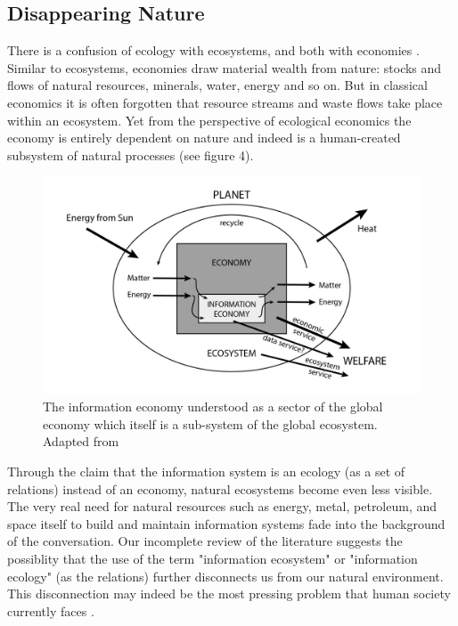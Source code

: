 \subsection{Disappearing Nature}

There is a confusion of ecology with ecosystems, and both with economies \citep[cf. ][]{lucas_2012,nardi_information_1999}. Similar to ecosystems, economies draw material wealth from nature: stocks and flows of natural resources, minerals, water, energy and so on. But in classical economics it is often forgotten that resource streams and waste flows take place within an ecosystem. Yet from the perspective of ecological economics the economy is entirely dependent on nature and indeed is a human-created subsystem of natural processes (see figure 4).

\begin{figure}[!ht]
  \centering
    \includegraphics[width=5.5in]{figures/ecologicalecon}
  \caption{The information economy understood as a sector of the global economy which itself is a sub-system of the global ecosystem. Adapted from \citep[][p. 18]{daly_2004}}
\end{figure}

Through the claim that the information system is an ecology (as a set of relations) instead of an economy, natural ecosystems become even less visible. The very real need for natural resources such as energy, metal, petroleum, and space itself to build and maintain information systems fade into the background of the conversation. Our incomplete review of the literature suggests the possiblity that the use of the term "information ecosystem" or "information ecology" (as the relations) further disconnects us from our natural environment.  This disconnection may indeed be the most pressing problem that human society currently faces \citep{worthy_2013}.

